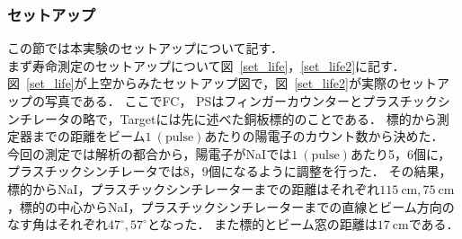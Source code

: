 \subsubsection{セットアップ}
この節では本実験のセットアップについて記す．\\
まず寿命測定のセットアップについて図~\ref{set_life}，\ref{set_life2}に記す．
図~\ref{set_life}が上空からみたセットアップ図で，図~\ref{set_life2}が実際のセットアップの写真である．
ここでFC， PSはフィンガーカウンターとプラスチックシンチレータの略で，Targetには先に述べた銅板標的のことである．
標的から測定器までの距離をビーム$1~(\mathrm{pulse})$あたりの陽電子のカウント数から決めた．
今回の測定では解析の都合から，陽電子がNaIでは$1~(\mathrm{pulse})$あたり5，6個に，プラスチックシンチレータでは8，9個になるように調整を行った．
その結果，標的からNaI，プラスチックシンチレーターまでの距離はそれぞれ$115~\mathrm{cm},75~\mathrm{cm}$，標的の中心からNaI，プラスチックシンチレーターまでの直線とビーム方向のなす角はそれぞれ$47^\circ, 57^\circ$となった．
また標的とビーム窓の距離は$17~\mathrm{cm}$である．
